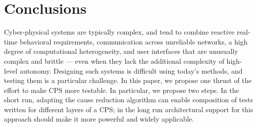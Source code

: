\section{Conclusions}

Cyber-physical systems are typically complex, and tend to combine reactive real-time behavioral requirements, communication across unreliable networks, a high degree of computational heterogeneity, and user interfaces that are unusually complex and brittle --- even when they lack the additional complexity of high-level autonomy.  Designing such systems is difficult using today's methods, and testing them is a particular challenge.  In this paper, we propose one thrust of the effort to make CPS more testable.  In particular, we propose two steps.  In the short run, adapting the cause reduction algorithm can enable composition of tests written for different layers of a CPS; in the long run architectural support for this approach should make it more powerful and widely applicable.